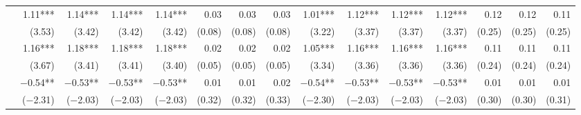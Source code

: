 \begin{tabularx}{1.45\textwidth}{lRRRRRRRRRRRRRR}
		 & \num{1.11}***\phantom{)} & \num{1.14}***\phantom{)} & \num{1.14}***\phantom{)} & \num{1.14}***\phantom{)} & \num{0.03}\phantom{***)} & \num{0.03}\phantom{***)} & \num{0.03}\phantom{***)} & \num{1.01}***\phantom{)} & \num{1.12}***\phantom{)} & \num{1.12}***\phantom{)} & \num{1.12}***\phantom{)} & \num{0.12}\phantom{***)} & \num{0.12}\phantom{***)} & \num{0.11}\phantom{***)} \\
		 & (\num{3.53})\phantom{***} & (\num{3.42})\phantom{***} & (\num{3.42})\phantom{***} & (\num{3.42})\phantom{***} & (\num{0.08})\phantom{***} & (\num{0.08})\phantom{***} & (\num{0.08})\phantom{***} & (\num{3.22})\phantom{***} & (\num{3.37})\phantom{***} & (\num{3.37})\phantom{***} & (\num{3.37})\phantom{***} & (\num{0.25})\phantom{***} & (\num{0.25})\phantom{***} & (\num{0.25})\phantom{***} \\ [\dspacing]
		 & \num{1.16}***\phantom{)} & \num{1.18}***\phantom{)} & \num{1.18}***\phantom{)} & \num{1.18}***\phantom{)} & \num{0.02}\phantom{***)} & \num{0.02}\phantom{***)} & \num{0.02}\phantom{***)} & \num{1.05}***\phantom{)} & \num{1.16}***\phantom{)} & \num{1.16}***\phantom{)} & \num{1.16}***\phantom{)} & \num{0.11}\phantom{***)} & \num{0.11}\phantom{***)} & \num{0.11}\phantom{***)} \\
		 & (\num{3.67})\phantom{***} & (\num{3.41})\phantom{***} & (\num{3.41})\phantom{***} & (\num{3.40})\phantom{***} & (\num{0.05})\phantom{***} & (\num{0.05})\phantom{***} & (\num{0.05})\phantom{***} & (\num{3.34})\phantom{***} & (\num{3.36})\phantom{***} & (\num{3.36})\phantom{***} & (\num{3.36})\phantom{***} & (\num{0.24})\phantom{***} & (\num{0.24})\phantom{***} & (\num{0.24})\phantom{***} \\ [\dspacing]
		 & \num{-0.54}**\phantom{*)} & \num{-0.53}**\phantom{*)} & \num{-0.53}**\phantom{*)} & \num{-0.53}**\phantom{*)} & \num{0.01}\phantom{***)} & \num{0.01}\phantom{***)} & \num{0.02}\phantom{***)} & \num{-0.54}**\phantom{*)} & \num{-0.53}**\phantom{*)} & \num{-0.53}**\phantom{*)} & \num{-0.53}**\phantom{*)} & \num{0.01}\phantom{***)} & \num{0.01}\phantom{***)} & \num{0.01}\phantom{***)} \\
		 & (\num{-2.31})\phantom{***} & (\num{-2.03})\phantom{***} & (\num{-2.03})\phantom{***} & (\num{-2.03})\phantom{***} & (\num{0.32})\phantom{***} & (\num{0.32})\phantom{***} & (\num{0.33})\phantom{***} & (\num{-2.30})\phantom{***} & (\num{-2.03})\phantom{***} & (\num{-2.03})\phantom{***} & (\num{-2.03})\phantom{***} & (\num{0.30})\phantom{***} & (\num{0.30})\phantom{***} & (\num{0.31})\phantom{***} \\ [\dspacing]


\end{tabularx}
